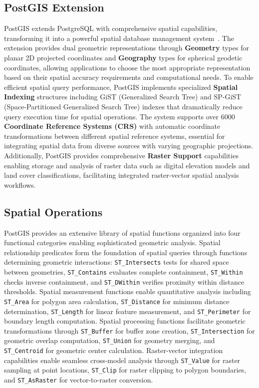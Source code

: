 \subsection{PostGIS Extension}

PostGIS extends PostgreSQL with comprehensive spatial capabilities, transforming it into a powerful spatial database management system~\cite{obe2021postgis}. The extension provides dual geometric representations through \textbf{Geometry} types for planar 2D projected coordinates and \textbf{Geography} types for spherical geodetic coordinates, allowing applications to choose the most appropriate representation based on their spatial accuracy requirements and computational needs. To enable efficient spatial query performance, PostGIS implements specialized \textbf{Spatial Indexing} structures including GiST (Generalized Search Tree) and SP-GiST (Space-Partitioned Generalized Search Tree) indexes that dramatically reduce query execution time for spatial operations. The system supports over 6000 \textbf{Coordinate Reference Systems (CRS)} with automatic coordinate transformations between different spatial reference systems, essential for integrating spatial data from diverse sources with varying geographic projections. Additionally, PostGIS provides comprehensive \textbf{Raster Support} capabilities enabling storage and analysis of raster data such as digital elevation models and land cover classifications, facilitating integrated raster-vector spatial analysis workflows.

\subsection{Spatial Operations}

PostGIS provides an extensive library of spatial functions organized into four functional categories enabling sophisticated geometric analysis. Spatial relationship predicates form the foundation of spatial queries through functions determining geometric interactions: \texttt{ST\_Intersects} tests for shared space between geometries, \texttt{ST\_Contains} evaluates complete containment, \texttt{ST\_Within} checks inverse containment, and \texttt{ST\_DWithin} verifies proximity within distance thresholds. Spatial measurement functions enable quantitative analysis including \texttt{ST\_Area} for polygon area calculation, \texttt{ST\_Distance} for minimum distance determination, \texttt{ST\_Length} for linear feature measurement, and \texttt{ST\_Perimeter} for boundary length computation. Spatial processing functions facilitate geometric transformations through \texttt{ST\_Buffer} for buffer zone creation, \texttt{ST\_Intersection} for geometric overlap computation, \texttt{ST\_Union} for geometry merging, and \texttt{ST\_Centroid} for geometric center calculation. Raster-vector integration capabilities enable seamless cross-model analysis through \texttt{ST\_Value} for raster sampling at point locations, \texttt{ST\_Clip} for raster clipping to polygon boundaries, and \texttt{ST\_AsRaster} for vector-to-raster conversion.

